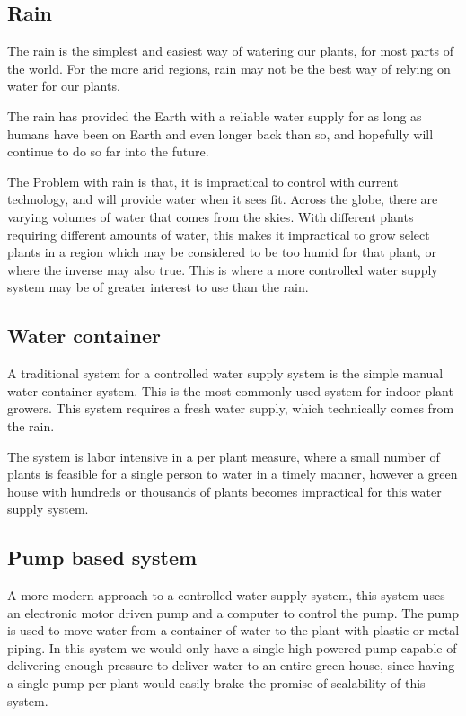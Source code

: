 \documentclass[12pt,a4paper,oneside]{book}
\begin{document}
\subsection{Rain}
The rain is the simplest and easiest way of watering our plants, for most parts of the world. For the more arid regions, rain may not be the best way of relying on water for our plants.

The rain has provided the Earth with a reliable water supply for as long as humans have been on Earth and even longer back than so, and hopefully will continue to do so far into the future.

The Problem with rain is that, it is impractical to control with current technology, and will provide water when it sees fit.
Across the globe, there are varying volumes of water that comes from the skies. With different plants requiring different amounts of water, this makes it impractical to grow select plants in a region which may be considered to be too humid for that plant, or where the inverse may also true. This is where a more controlled water supply system may be of greater interest to use than the rain.

\subsection{Water container}
A traditional system for a controlled water supply system is the simple manual water container system.
This is the most commonly used system for indoor plant growers. This system requires a fresh water supply, which technically comes from the rain.

The system is labor intensive in a per plant measure, where a small number of plants is feasible for a single person to water in a timely manner, however a green house with hundreds or thousands of plants becomes impractical for this water supply system.

\subsection{Pump based system}
A more modern approach to a controlled water supply system, this system uses an electronic motor driven pump and a computer to control the pump. The pump is used to move water from a container of water to the plant with plastic or metal piping. In this system we would only have a single high powered pump capable of delivering enough pressure to deliver water to an entire green house, since having a single pump per plant would easily brake the promise of scalability of this system.
\end{document}
